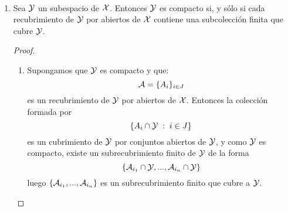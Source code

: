 \begin{obs} \
	\begin{enumerate}
		\item Sea $\mathcal{Y}$ un subespacio de $\mathcal{X}$. Entonces $\mathcal{Y}$ es compacto si, y sólo si cada recubrimiento de $\mathcal{Y}$ por abiertos de $\mathcal{X}$ contiene una subcolección finita que cubre $\mathcal{Y}$.
		\begin{proof} \
			\begin{enumerate}
				\item[\bra] 	Supongamos que $\mathcal{Y}$ es compacto y que:
					\begin{equation*}
						\mathcal{A}=\{A_i\}_{i \in J}
					\end{equation*}
					es un recubrimiento de $\mathcal{Y}$ por abiertos de $\mathcal{X}$. Entonces la colección formada por
					\begin{equation*}
						\{A_i \cap \mathcal{Y} \;:\; i \in J\}
					\end{equation*} es un cubrimiento de $\mathcal{Y}$ por conjuntos abiertos de $\mathcal{Y}$, y como $\mathcal{Y}$ es compacto, existe un subrecubrimiento finito de $\mathcal{Y}$ de la forma
					\begin{equation*}
						\{\mathcal{A}_{i_1} \cap \mathcal{Y}, ... , \mathcal{A}_{i_n} \cap \mathcal{Y}\} 
					\end{equation*}
						luego $\{\mathcal{A}_{i_1}, ... , \mathcal{A}_{i_n}\}$ es un subrecubrimiento finito que cubre a $\mathcal{Y}$.
				

\end{enumerate}
\end{proof}
\end{enumerate}
\end{obs}

